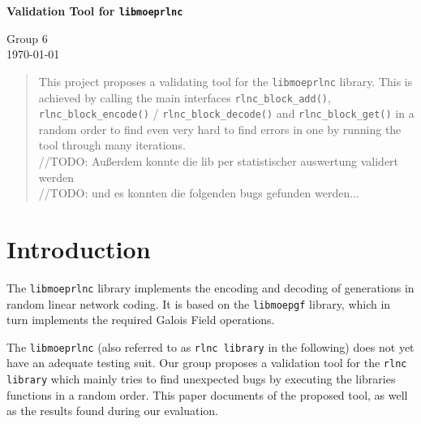 \documentclass[a4paper,english,10pt]{tumarticle}
\begin{document}
\begin{center}
	\bfseries\Large Validation Tool for \texttt{libmoeprlnc}\\[.5\baselineskip]
\end{center}
\begin{center}
	\small Group 6\\
	\today
\end{center}


\setcounter{tocdepth}{1}
\renewcommand{\contentsname}{Anlagen}

\renewcommand{\emph}[1]{%
	\textcolor{TUMBlue}{#1}%
}


\renewcommand{\abstractname}{Abstract}
\begin{abstract}
\setlength{\parindent}{0pt}
\noindent%
\footnotesize

This project proposes a validating tool for the \texttt{libmoeprlnc} library. 
This is achieved by calling the main interfaces \texttt{rlnc\_block\_add()}, 
\texttt{rlnc\_block\_encode()} / \texttt{rlnc\_block\_decode()} and \texttt{rlnc\_block\_get()} in a 
random order to find even very hard to find errors in one by running the tool through 
many iterations.\\
//TODO: Außerdem konnte die lib per statistischer auswertung validert werden\\
//TODO: und es konnten die folgenden bugs gefunden werden...

\end{abstract}

\section{Introduction}

The \texttt{libmoeprlnc} library implements the encoding and decoding of generations in
random linear network coding. It is based on the \texttt{libmoepgf} library, which in turn
implements the required Galois Field operations.

The \texttt{libmoeprlnc} (also referred to as \texttt{rlnc library} in the following) does not yet have an 
adequate testing suit. Our group proposes a validation tool for the \texttt{rlnc library} which mainly tries to 
find unexpected bugs by executing the libraries functions in a random order.
This paper documents of the proposed tool, as well as the results found during our evaluation.
\end{document}
